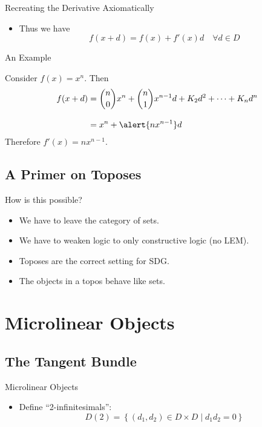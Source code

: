 \documentclass{beamer}
\begin{document}
\begin{frame}{Recreating the Derivative Axiomatically}
  \begin{itemize}
    \item Thus we have
      \begin{equation*}
        f(x+d) = f(x) + f'(x)d\quad \forall d\in D
      \end{equation*}
  \end{itemize}
\end{frame}

\begin{frame}{An Example}
  \begin{exmp}
    Consider \( f(x) = x^n \). Then
    \begin{align*}
      f(x+d) &= \binom{n}{0}x^n + \binom{n}{1}x^{n-1}d + K_2d^2 + \dots + K_nd^n  \\[2ex]
             &= x^n + \alert{nx^{n-1}}d
    \end{align*}
    Therefore \( f'(x) = nx^{n-1} \).
  \end{exmp}
\end{frame}

\subsection{A Primer on Toposes}

\begin{frame}{How is this possible?}
  \begin{itemize}
    \pause
    \item We have to leave the category of sets.
    \pause
    \item We have to weaken logic to only constructive logic (no LEM).
    \pause
    \item Toposes are the correct setting for SDG.
    \pause
    \item The objects in a topos behave like sets.
  \end{itemize}
\end{frame}

\section{Microlinear Objects}

\subsection{The Tangent Bundle}


\begin{frame}{Microlinear Objects}
  \begin{itemize}
    \item Define ``2-infinitesimals'':
      \begin{equation*}
        D(2) =  \left\{(d_1,d_2)\in D\times D \mid d_1d_2 = 0\right\}
      \end{equation*}
  \end{itemize}
\end{frame}
\end{document}
